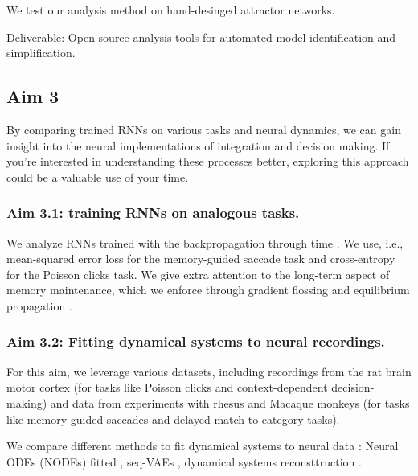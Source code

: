 \documentclass[12pt,letterpaper, onecolumn]{article}
\theoremstyle{definition}
\theoremstyle{remark}
\begin{document}
%
We test our analysis method on hand-desinged attractor networks.

Deliverable: Open-source analysis tools for automated model identification and simplification.









\subsection*{Aim 3}

By comparing trained RNNs on various tasks and neural dynamics, we can gain insight into the neural implementations of integration and decision making. If you're interested in understanding these processes better, exploring this approach could be a valuable use of your time.



\subsubsection*{Aim 3.1: training RNNs on analogous tasks.}
We analyze RNNs trained with the backpropagation through time \citep{farrell2022, schuessler2020}.
We use, i.e., mean-squared error loss for the memory-guided saccade task and cross-entropy for the Poisson clicks task.
We give extra attention to the long-term aspect of memory maintenance, which we enforce through gradient flossing \citep{engelken2023b} and equilibrium propagation \citep{laborieux2023}.





\subsubsection*{Aim 3.2: Fitting dynamical systems to neural recordings.}

For this aim, we leverage various datasets, including recordings from the rat brain motor cortex (for tasks like Poisson clicks and context-dependent decision-making) and data from experiments with rhesus and Macaque monkeys (for tasks like memory-guided saccades and delayed match-to-category tasks).

 

We compare different methods to fit dynamical systems to neural data \citep{zhao2016}:
 Neural ODEs (NODEs) fitted \citep{kim2021inferring},
 seq-VAEs \citep{pandarinath2018inferring},
dynamical systems reconsttruction \citep{schmidt2019}.
\end{document}

